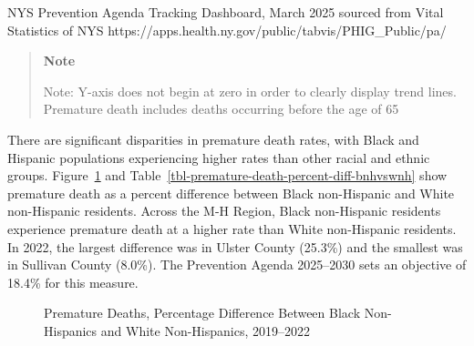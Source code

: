 \documentclass[
  english,
  letterpaper,
]{report}
\begin{document}
\begin{tcolorbox}[enhanced jigsaw, breakable, leftrule=.75mm, title=\textcolor{quarto-callout-note-color}{\faInfo}\hspace{0.5em}{Source}, bottomrule=.15mm, opacityback=0, left=2mm, colback=white, bottomtitle=1mm, coltitle=black, colbacktitle=quarto-callout-note-color!10!white, colframe=quarto-callout-note-color-frame, opacitybacktitle=0.6, toptitle=1mm, titlerule=0mm, arc=.35mm, rightrule=.15mm, toprule=.15mm]

NYS Prevention Agenda Tracking Dashboard, March 2025 sourced from Vital
Statistics of NYS
https://apps.health.ny.gov/public/tabvis/PHIG\_Public/pa/

\begin{quote}
\textbf{Note}

Note: Y-axis does not begin at zero in order to clearly display trend
lines. Premature death includes deaths occurring before the age of 65
\end{quote}

\end{tcolorbox}

There are significant disparities in premature death rates, with Black
and Hispanic populations experiencing higher rates than other racial and
ethnic groups. Figure~\ref{fig-premature-death-percent-diff-bnhvswnh}
and Table~\ref{tbl-premature-death-percent-diff-bnhvswnh} show premature
death as a percent difference between Black non-Hispanic and White
non-Hispanic residents. Across the M-H Region, Black non-Hispanic
residents experience premature death at a higher rate than White
non-Hispanic residents. In 2022, the largest difference was in Ulster
County (25.3\%) and the smallest was in Sullivan County (8.0\%). The
Prevention Agenda 2025--2030 sets an objective of 18.4\% for this
measure.

\begin{figure}


\caption{\label{fig-premature-death-percent-diff-bnhvswnh}Premature
Deaths, Percentage Difference Between Black Non-Hispanics and White
Non-Hispanics, 2019--2022}

\end{figure}%
\end{document}
